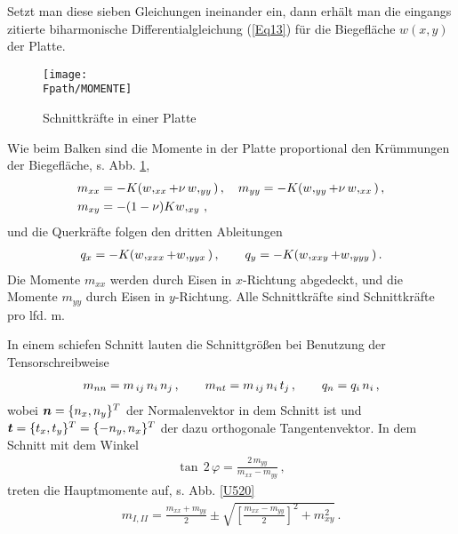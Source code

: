 Setzt man diese sieben Gleichungen ineinander ein, dann erh\"{a}lt man die eingangs zitierte biharmonische Differentialgleichung (\ref{Eq13}) f\"{u}r die Biegefl\"{a}che $w(x,y)$ der Platte.
\begin{figure}[tbp]
\centering
\if {} \sidecaption \fi
\texttt{[image: \\Fpath/MOMENTE]}
\caption{Schnittkr\"{a}fte in einer Platte} \label{Momente}
\end{figure}%

Wie beim Balken sind die Momente in der Platte proportional den Kr\"{u}mmungen der Biegefl\"{a}che, s. Abb. \ref{Momente},
\begin{align}
    m_{xx} &= - K(w,_{xx} + \nu\, w,_{yy})\,, \quad    m_{yy} = -
K(w,_{yy} + \nu\, w,_{xx})\,, \nonumber \\
    m_{xy} &= - (1-\nu) K w,_{xy}\,,\nonumber
\end{align}
und die Querkr\"{a}fte folgen den dritten Ableitungen
\begin{align}
    q_x = - K(w,_{xxx} + w,_{yyx})\,, \qquad   q_y = -
K(w,_{xxy} + w,_{yyy}) \nonumber \,.
\end{align}
Die Momente $m_{xx}$ werden durch Eisen in $x$-Richtung abgedeckt, und die Momente $m_{yy}$ durch Eisen in $y$-Richtung. Alle Schnittkr\"{a}fte sind Schnittkr\"{a}fte pro lfd. m.


In einem schiefen Schnitt lauten die Schnittgr\"{o}{\ss}en bei Benutzung der Tensorschreibweise
\begin{align}
m_{nn} = m_{\,ij}\, n_i\,n_j\,, \qquad m_{nt} = m_{\,ij}\, n_i\,t_j\,, \qquad q_n = q_i\, n_i
\,,\nonumber
\end{align}
wobei $\mbox{\boldmath $n$} = \{n_x,n_y\}^T$ der Normalenvektor in dem Schnitt ist und $\mbox{\boldmath $t$} =
\{t_x,t_y\}^T = \{-n_y,n_x\}^T$ der dazu orthogonale Tangentenvektor. In dem Schnitt mit dem Winkel
\begin{align}
\tan\,2\,\varphi = \frac{2\,m_{yy}}{m_{xx} - m_{yy}}\,,
\end{align}
treten die Hauptmomente auf, s. Abb. \ref{U520}
\begin{align}
m_{I,II} = \frac{m_{xx} + m_{yy}}{2} \pm \sqrt{\left[\frac{m_{xx} - m_{yy}}{2}\right]^2 +
m_{xy}^2}\,.
\end{align}

